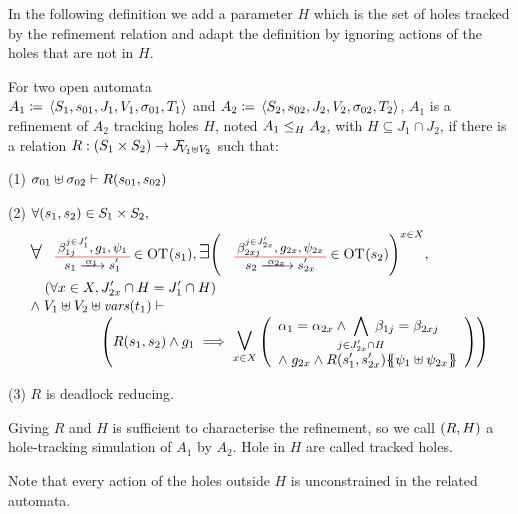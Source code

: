 \documentclass[runningheads]{llncs}
\begin{document}
In the following definition we add a parameter $H$ which is the set of holes tracked by the refinement relation and adapt the definition by ignoring actions of the holes that are not in $H$.
\begin{definition}\label{Def:OA-Refinement}
For two open automata\\ \(A_1 \defobject \OA{S_1}{s_{01}}{J_1}{V_1}{\sigma_{01}}{T_1}\) and \(A_2 \defobject \OA{S_2}{s_{02}}{J_2}{V_2}{\sigma_{02}}{T_2}\), \(A_1\) is a refinement of \(A_2\) tracking holes \(H\), noted \(\wrel{A_1}{A_2}{H}\), with \(H \subseteq J_1 \cap J_2\), if there is a relation $R: \mpar{S_1 \times S_2} \to \rformulas[V_1 \uplus V_2]$ such that:
\item[(1)] \(\sigma_{01} \uplus \sigma_{02} \vdash R\mpar{s_{01}, s_{02}}\)
\item[(2)] \(\forall \mpar{s_1, s_2} \in S_1 \times S_2,\)
\begin{multline*}
	\everymath{\displaystyle}\begin{array}{l}
		\bigsymb{\forall} \OTx{1}{}{1}{1} \in \fOT{s_1}, \bigsymb{\exists} \mpar{\OTx{2}{x}{2x}{2x} \in \fOT{s_2}}^{x \in X}, \\[12pt]
		\quad \mpar{\forall x \in X, J'_{2x} \cap H = J'_1 \cap H} \\[1pt]
		\nwedge V_1 \uplus V_2 \uplus \fvars{t_1} \vdash\\\hspace{5em} \mpar{R\mpar{s_1, s_2} \wedge g_1 \implies \operatorname*{\bigsymb{\bigvee}}_{x \in X} \mpar{\begin{array}{l}
			\alpha_1 = \alpha_{2x} \wedge \bigwedge_\subbox{j \in J'_{2x} \cap H} \beta_{1j} = \beta_{2xj} \\
			\nwedge g_{2x} \wedge R\mpar{s'_1, s'_{2x}}\psubst{\psi_1 \uplus \psi_{2x}}
		\end{array}}} 
	\end{array} 
\end{multline*}
\item[(3)] $R$ is deadlock reducing.

Giving \(R\) and \(H\) is sufficient to characterise the refinement, so we call \(\mpar{R, H}\) a hole-tracking simulation of \(A_1\) by \(A_2\).
Hole in \(H\) are called tracked holes.
\end{definition}
Note that every action of the holes outside \(H\) is unconstrained in the related automata. 
\end{document}

